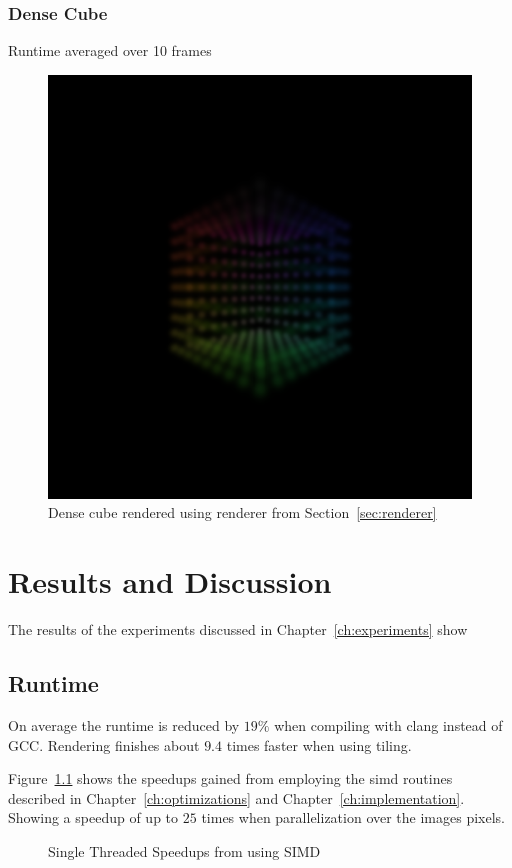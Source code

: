 \documentclass[a4paper, 11pt]{memoir}
\begin{document}
    \subsection{Dense Cube}
    Runtime averaged over 10 frames
    \begin{figure}[H]
        \centering
        \includegraphics[scale=.2]{images/cube.png}
        \caption{Dense cube rendered using renderer from Section~\ref{sec:renderer}}
        \label{fig:cube_render}
    \end{figure}
    
    \chapter{Results and Discussion}

    The results of the experiments discussed in Chapter~\ref{ch:experiments} show

    \section{Runtime}

    On average the runtime is reduced by $19\%$ when compiling with clang instead of GCC.
    Rendering finishes about $9.4$ times faster when using tiling.

    Figure~\ref{fig:runtimes_st_simd_speedup} shows
    the speedups gained from employing the \gls{simd} routines described in Chapter~\ref{ch:optimizations}
    and Chapter~\ref{ch:implementation}. Showing a speedup of up to $25$ times when
    parallelization over the images pixels.
    \begin{figure}[H]
        \centering
        
        \caption{Single Threaded Speedups from using SIMD}
        \label{fig:runtimes_st_simd_speedup}
    \end{figure}
\end{document}
